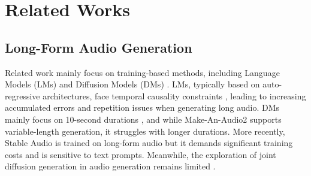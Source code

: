 \section{Related Works}
\subsection{Long-Form Audio Generation}
Related work mainly focus on training-based methods, including Language Models (LMs) \cite{agostinelli2023musiclm, copet2023simple, borsos2023audiolm} and Diffusion Models (DMs) \cite{evans2024long, Evans2024FastTL, tan2024litefocus}. LMs, typically based on auto-regressive architectures, face temporal causality constraints \cite{agostinelli2023musiclm, copet2023simple, borsos2023audiolm, kreuk2022audiogen}, leading to increasing accumulated errors and repetition issues when generating long audio. DMs mainly focus on 10-second durations \cite{liu2023audioldm, ghosal2023tango, majumder2024tango, Huang2023MakeAnAudio2T}, and while Make-An-Audio2 \cite{Huang2023MakeAnAudio2T} supports variable-length generation, it struggles with longer durations. More recently, Stable Audio \cite{Evans2024FastTL, evans2024long} is trained on long-form audio but it demands significant training costs and is sensitive to text prompts. Meanwhile, the exploration of joint diffusion generation in audio generation remains limited \cite{polyak2024movie}.




